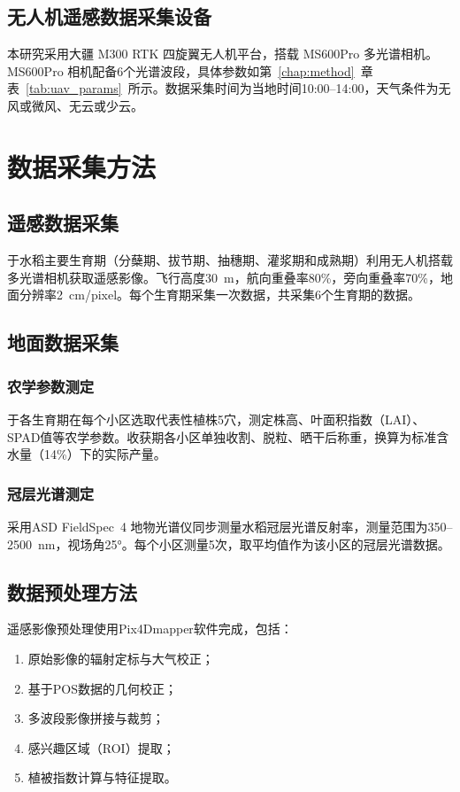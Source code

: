 \subsection{无人机遥感数据采集设备}
\label{subsec:uav_equipment}

本研究采用大疆 M300 RTK 四旋翼无人机平台，搭载 MS600Pro 多光谱相机。MS600Pro 相机配备6个光谱波段，具体参数如第~\ref{chap:method}~章表~\ref{tab:uav_params}~所示。数据采集时间为当地时间10:00--14:00，天气条件为无风或微风、无云或少云。

\section{数据采集方法}
\label{sec:data_collection}

\subsection{遥感数据采集}
\label{subsec:remote_sensing}

于水稻主要生育期（分蘖期、拔节期、抽穗期、灌浆期和成熟期）利用无人机搭载多光谱相机获取遥感影像。飞行高度30~m，航向重叠率80\%，旁向重叠率70\%，地面分辨率2~cm/pixel。每个生育期采集一次数据，共采集6个生育期的数据。

\subsection{地面数据采集}
\label{subsec:ground_data}

\subsubsection{农学参数测定}
于各生育期在每个小区选取代表性植株5穴，测定株高、叶面积指数（LAI）、SPAD值等农学参数。收获期各小区单独收割、脱粒、晒干后称重，换算为标准含水量（14\%）下的实际产量。

\subsubsection{冠层光谱测定}
采用ASD FieldSpec~4 地物光谱仪同步测量水稻冠层光谱反射率，测量范围为350--2500~nm，视场角25°。每个小区测量5次，取平均值作为该小区的冠层光谱数据。

\subsection{数据预处理方法}
\label{subsec:preprocess}

遥感影像预处理使用Pix4Dmapper软件完成，包括：
\begin{enumerate}[itemsep=0pt,parsep=0pt]
  \item 原始影像的辐射定标与大气校正；
  \item 基于POS数据的几何校正；
  \item 多波段影像拼接与裁剪；
  \item 感兴趣区域（ROI）提取；
  \item 植被指数计算与特征提取。
\end{enumerate}

